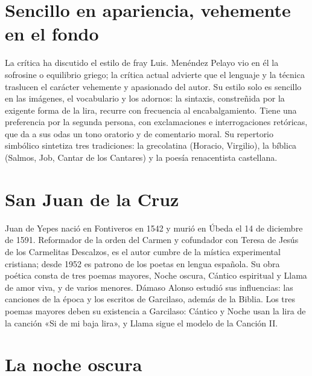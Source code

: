 \documentclass{book}
\begin{document}

\section{Sencillo en apariencia, vehemente en el fondo}

La crítica ha discutido el estilo de fray Luis. Menéndez Pelayo vio en él la sofrosine o equilibrio griego; la crítica actual advierte que el lenguaje y la técnica traslucen el carácter vehemente y apasionado del autor. Su estilo solo es sencillo en las imágenes, el vocabulario y los adornos: la sintaxis, constreñida por la exigente forma de la lira, recurre con frecuencia al encabalgamiento. Tiene una preferencia por la segunda persona, con exclamaciones e interrogaciones retóricas, que da a sus odas un tono oratorio y de comentario moral. Su repertorio simbólico sintetiza tres tradiciones: la grecolatina (Horacio, Virgilio), la bíblica (Salmos, Job, Cantar de los Cantares) y la poesía renacentista castellana.


\section{San Juan de la Cruz}

Juan de Yepes nació en Fontiveros en 1542 y murió en Úbeda el 14 de diciembre de 1591. Reformador de la orden del Carmen y cofundador con Teresa de Jesús de los Carmelitas Descalzos, es el autor cumbre de la mística experimental cristiana; desde 1952 es patrono de los poetas en lengua española. Su obra poética consta de tres poemas mayores, Noche oscura, Cántico espiritual y Llama de amor viva, y de varios menores. Dámaso Alonso estudió sus influencias: las canciones de la época y los escritos de Garcilaso, además de la Biblia. Los tres poemas mayores deben su existencia a Garcilaso: Cántico y Noche usan la lira de la canción «Si de mi baja lira», y Llama sigue el modelo de la Canción II.


\section{La noche oscura}
\end{document}

